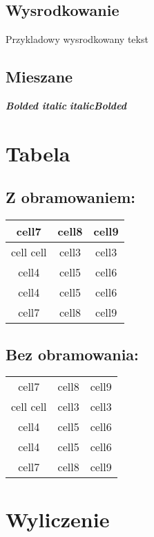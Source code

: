 \documentclass{report}
\begin{document}
        \subsection{Wysrodkowanie}
            \centerline{Przykladowy wysrodkowany tekst}

        \subsection{Mieszane}
            \textbf{\textit{Bolded italic}}
            \newline
            \textit{\textbf{italicBolded}}

    \section{Tabela}
        \subsection{Z obramowaniem:}
            \begin{tabular}{| c | c | c |}
                \hline
                cell7 & cell8 & cell9\\
                \hline
                cell cell & cell3 & cell3 \\
                \hline
                cell4 & cell5 & cell6 \\
                \hline
                cell4 & cell5 & cell6 \\
                \hline
                cell7 & cell8 & cell9
            \end{tabular}

        \subsection{Bez obramowania:}
            \begin{tabular}{c c c}
                cell7 & cell8 & cell9\\
                cell cell & cell3 & cell3 \\
                cell4 & cell5 & cell6 \\
                cell4 & cell5 & cell6 \\
                cell7 & cell8 & cell9
            \end{tabular}

    \section{Wyliczenie}
\end{document}

